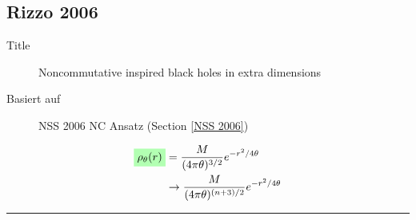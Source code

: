 \documentclass[10pt,a4paper, fleqn]{article}
\newcommand{\highlight}[1]{%
  \colorbox{green!30}{$\displaystyle#1$}}
\begin{document}
\begin{multicols}{2}
\subsection{Rizzo 2006}\label{Rizzo2006}
\begin{description}
  \item[Title] Noncommutative inspired black holes in extra dimensions
  \item[Basiert auf]  NSS 2006 NC Ansatz (Section \ref{NSS 2006})
\end{description}

\vfill
\columnbreak
\begin{align}
\highlight{ \rho_\theta(r) } &= \frac{M}{(4 \pi \theta)^{3/2}} e^{-r^2 / 4 \theta} \\
&\to \frac{M}{(4\pi\theta)^{(n+3)/2}} e^{-r^2 / 4\theta}
\end{align}

\end{multicols}
\rule{0.9\textwidth}{0.4pt}
\end{document}
